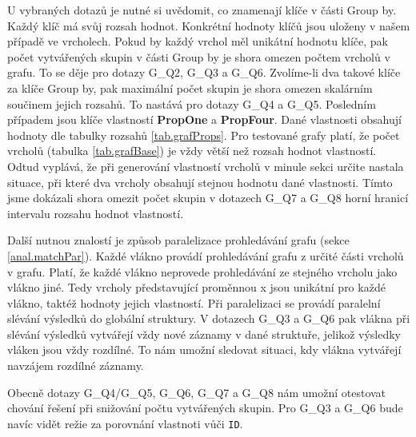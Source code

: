 U vybraných dotazů je nutné si uvědomit, co znamenají klíče v části Group by.
Každý klíč má svůj rozsah hodnot.
Konkrétní hodnoty klíčů jsou uloženy v našem případě ve vrcholech.
Pokud by každý vrchol měl unikátní hodnotu klíče, pak počet vytvářených skupin v části Group by je shora omezen počtem vrcholů v grafu.
To se děje pro dotazy G\_Q2, G\_Q3 a G\_Q6.
Zvolíme-li dva takové klíče za klíče Group by, pak maximální počet skupin je shora omezen skalárním součinem jejich rozsahů.
To nastává pro dotazy  G\_Q4 a G\_Q5.
Posledním případem jsou klíče vlastností \textbf{PropOne} a \textbf{PropFour}.
Dané vlastnosti obsahují hodnoty dle tabulky rozsahů \ref{tab.grafProps}.
Pro testované grafy platí, že počet vrcholů (tabulka \ref{tab.grafBase}) je vždy větší než rozsah hodnot vlastností.
Odtud vyplává, že při generování vlastností vrcholů v minule sekci určite nastala situace, při které dva vrcholy obsahují stejnou hodnotu dané vlastnosti.
Tímto jsme dokázali shora omezit počet skupin v dotazech G\_Q7 a G\_Q8 horní hranicí intervalu rozsahu hodnot vlastností.

Další nutnou znalostí je způsob paralelizace prohledávání grafu (sekce \ref{anal.matchPar}).
Každé vlákno provádí prohledávání grafu z určité části vrcholů v grafu.
Platí, že každé vlákno neprovede prohledávání ze stejného vrcholu jako vlákno jiné.
Tedy vrcholy představující proměnnou x jsou unikátní pro každé vlákno, taktéž hodnoty jejich vlastností.
Při paralelizaci se provádí paralelní slévání výsledků do globální struktury.
V dotazech G\_Q3 a G\_Q6 pak vlákna při slévání výsledků vytvářejí vždy nové záznamy v dané struktuře, jelikož výsledky vláken jsou vždy rozdílné.  
To nám umožní sledovat situaci, kdy vlákna vytvářejí navzájem rozdílné záznamy.

Obecně dotazy G\_Q4/G\_Q5, G\_Q6, G\_Q7 a G\_Q8 nám umožní otestovat chování řešení při snižování počtu vytvářených skupin.
Pro G\_Q3 a G\_Q6 bude navíc vidět režie za porovnání vlastnoti vůči \verb+ID+.

